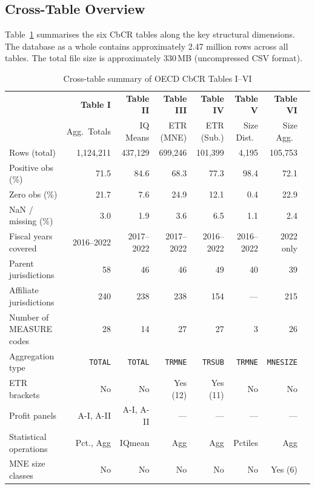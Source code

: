 \documentclass[11pt,a4paper]{article}
\newcommand{\code}[1]{\texttt{#1}}
\begin{document}
\subsection{Cross-Table Overview}\label{sec:crossoverview}

Table~\ref{tab:crosssummary} summarises the six CbCR tables along the key
structural dimensions. The database as a whole contains approximately 2.47 million
rows across all tables. The total file size is approximately 330\,MB (uncompressed
CSV format).

\begin{landscape}
\begin{table}[H]
\centering
\caption{Cross-table summary of OECD CbCR Tables I--VI}
\label{tab:crosssummary}
\footnotesize
\begin{tabular}{@{}lrrrrrrr@{}}
\toprule
 & \textbf{Table I} & \textbf{Table II} & \textbf{Table III} & \textbf{Table IV} & \textbf{Table V} & \textbf{Table VI} \\
 & Agg.\ Totals & IQ Means & ETR (MNE) & ETR (Sub.) & Size Dist.\ & Size Agg.\ \\
\midrule
Rows (total) & 1,124,211 & 437,129 & 699,246 & 101,399 & 4,195 & 105,753 \\
Positive obs (\%) & 71.5 & 84.6 & 68.3 & 77.3 & 98.4 & 72.1 \\
Zero obs (\%) & 21.7 & 7.6 & 24.9 & 12.1 & 0.4 & 22.9 \\
NaN / missing (\%) & 3.0 & 1.9 & 3.6 & 6.5 & 1.1 & 2.4 \\
\addlinespace
Fiscal years covered & 2016--2022 & 2017--2022 & 2017--2022 & 2016--2022 & 2016--2022 & 2022 only \\
Parent jurisdictions & 58 & 46 & 46 & 49 & 40 & 39 \\
Affiliate jurisdictions & 240 & 238 & 238 & 154 & --- & 215 \\
Number of MEASURE codes & 28 & 14 & 27 & 27 & 3 & 26 \\
\addlinespace
Aggregation type & \code{TOTAL} & \code{TOTAL} & \code{TRMNE} & \code{TRSUB} & \code{TRMNE} & \code{MNESIZE} \\
ETR brackets & No & No & Yes (12) & Yes (11) & No & No \\
Profit panels & A-I, A-II & A-I, A-II & --- & --- & --- & --- \\
Statistical operations & Pct., Agg & IQmean & Agg & Agg & Pctiles & Agg \\
MNE size classes & No & No & No & No & No & Yes (6) \\
\bottomrule
\end{tabular}
\end{table}
\end{landscape}
\end{document}
